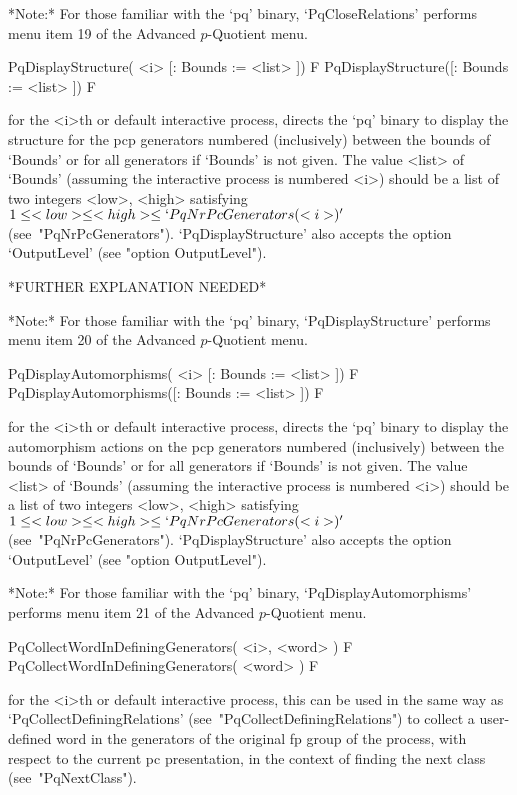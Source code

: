 *Note:* 
For those familiar with  the  `pq'  binary,  `PqCloseRelations'  performs
menu item 19 of the Advanced $p$-Quotient menu.

\>PqDisplayStructure( <i> [: Bounds := <list> ]) F
\>PqDisplayStructure([: Bounds := <list> ]) F

for the <i>th or default interactive {\ANUPQ} process, directs  the  `pq'
binary  to  display  the  structure  for  the  pcp  generators   numbered
(inclusively) between the bounds of `Bounds' or  for  all  generators  if
`Bounds' is not  given.  The  value  <list>  of  `Bounds'  (assuming  the
interactive process is numbered <i>) should be a  list  of  two  integers
<low>,   <high>   satisfying   $1    \le    <low>    \le    <high>    \le
`PqNrPcGenerators(<i>)'$  (see~"PqNrPcGenerators").  `PqDisplayStructure'
also accepts the option `OutputLevel' (see "option OutputLevel").

*FURTHER EXPLANATION NEEDED*

*Note:*
For those familiar with the `pq'  binary,  `PqDisplayStructure'  performs
menu item 20 of the Advanced $p$-Quotient menu.

\>PqDisplayAutomorphisms( <i> [: Bounds := <list> ]) F
\>PqDisplayAutomorphisms([: Bounds := <list> ]) F

for the <i>th or default interactive {\ANUPQ} process, directs  the  `pq'
binary to display the automorphism actions on the pcp generators numbered
(inclusively) between the bounds of `Bounds' or  for  all  generators  if
`Bounds' is not  given.  The  value  <list>  of  `Bounds'  (assuming  the
interactive process is numbered <i>) should be a  list  of  two  integers
<low>,   <high>   satisfying   $1    \le    <low>    \le    <high>    \le
`PqNrPcGenerators(<i>)'$  (see~"PqNrPcGenerators").  `PqDisplayStructure'
also accepts the option `OutputLevel' (see "option OutputLevel").

*Note:*
For  those  familiar  with  the  `pq'  binary,   `PqDisplayAutomorphisms'
performs menu item 21 of the Advanced $p$-Quotient menu.

\>PqCollectWordInDefiningGenerators( <i>, <word> ) F
\>PqCollectWordInDefiningGenerators( <word> ) F

for the <i>th or default interactive {\ANUPQ} process, this can  be  used
in      the      same      way      as       `PqCollectDefiningRelations'
(see~"PqCollectDefiningRelations") to collect a user-defined word in  the
generators of the original fp group of the process, with respect  to  the
current pc presentation,  in  the  context  of  finding  the  next  class
(see~"PqNextClass").

